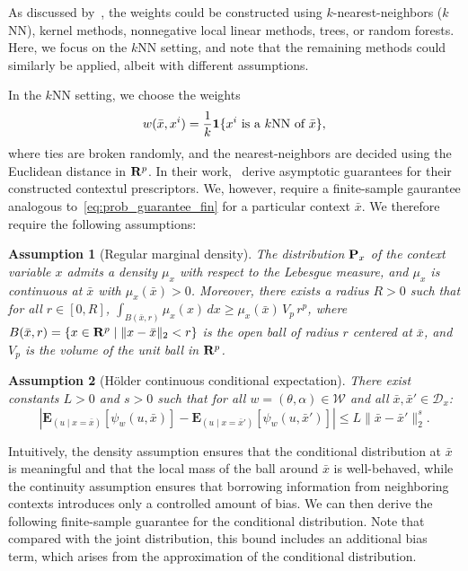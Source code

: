 \documentclass[11pt]{article}
\newtheorem{assumption}{Assumption}
\newtheorem{assumption}{Assumption}[section]
\begin{document}
As discussed by~\cite{bertsimas2020predictive}, the weights could be constructed using $k$-nearest-neighbors ($k$NN), kernel methods, nonnegative local linear methods, trees, or random forests. Here, we focus on the $k$NN setting, and note that the remaining methods could similarly be applied, albeit with different assumptions.

In the $k$NN setting, we choose the weights
$$w(\bar{x},x^i) = \frac{1}{k}\mathbf 1\{x^i\text{ is a $k$NN of } \bar{x}\}, $$
where ties are broken randomly, and the nearest-neighbors are decided using the Euclidean distance in ${\mathbf R}^p$. 
In their work,~\cite{bertsimas2020predictive} derive asymptotic guarantees for their constructed contextul prescriptors. We, however, require a finite-sample gaurantee analogous to~\eqref{eq:prob_guarantee_fin} for a particular context $\bar{x}$. We therefore require the following assumptions:
\begin{assumption}[Regular marginal density]
	\label{ass:positive}
	The distribution ${\mathbf P}_x$ of the context variable $x$ admits a density $\mu_x$ with respect to the Lebesgue measure, and $\mu_x$ is continuous at $\bar{x}$ with $\mu_x(\bar{x}) > 0$.
	Moreover, there exists a radius $R > 0$ such that for all $r \in [0, R]$,
	$\int_{B(\bar{x},r)} \mu_x(x)\, dx \geq \mu_x(\bar{x})\, V_p\, r^p$,
	where $B(\bar{x},r) = \{x \in {\mathbf R}^p \mid \|x - \bar{x}\|_2 < r\}$ is the open ball of radius $r$ centered at $\bar{x}$, and $V_p$ is the volume of the unit ball in ${\mathbf R}^p$.
\end{assumption}
\begin{assumption}[H\"{o}lder continuous conditional expectation]
	\label{ass:holder}
There exist constants $L > 0$ and $s > 0$ such that for all $w = (\theta, \alpha) \in \mathcal{W}$ and all $\bar{x}, \bar{x}' \in \mathcal{D}_x$:
\begin{equation*}
    \left| \mathbf{E}_{(u \mid {x = \bar{x}})}[\psi_w(u, \bar{x})] - \mathbf{E}_{(u \mid  {x = \bar{x}}')}[\psi_w(u, \bar{x}')] \right| \leq L \| \bar{x} - \bar{x}' \|_2^s.
\end{equation*}
\end{assumption}
Intuitively, the density assumption ensures that the conditional distribution at $\bar{x}$ is meaningful and that the local mass of the ball around $\bar{x}$ is well-behaved, while the continuity assumption ensures that borrowing information from neighboring contexts introduces only a controlled amount of bias.
We can then derive the following finite-sample guarantee for the conditional distribution. Note that compared with the joint distribution, this bound includes an additional bias term, which arises from the approximation of the conditional distribution.
\end{document}
